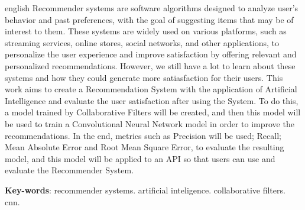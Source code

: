\begin{resumo}[Abstract]
 \begin{otherlanguage*}{english}
  Recommender systems are software algorithms designed to analyze user's behavior and past preferences, with 
  the goal of suggesting items that may be of interest to them. These systems are widely used on various platforms, 
  such as streaming services, online stores, social networks, and other applications, to personalize the user 
  experience and improve satisfaction by offering relevant and personalized recommendations. However, we still have a 
  lot to learn about these systems and how they could generate more satiasfaction for their users. This work aims to 
  create a Recommendation System with the application of Artificial Intelligence and evaluate the user satisfaction after 
  using the System. To do this, a model trained by Collaborative Filters will be created, and then this model will be used 
  to train a Convolutional Neural Network model in order to improve the recommendations. In the end, metrics such as 
  Precision will be used; Recall; Mean Absolute Error and Root Mean Square Error, to evaluate the resulting model, and this 
  model will be applied to an API so that users can use and evaluate the Recommender System.

   \vspace{\onelineskip}
 
   \noindent 
   \textbf{Key-words}: recommender systems. artificial inteligence. collaborative filters. cnn.
 \end{otherlanguage*}
\end{resumo}
